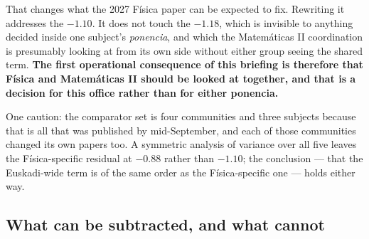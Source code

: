 \documentclass[
  10.5pt,
  a4paper,
  DIV=11,
  numbers=noendperiod]{scrartcl}
\begin{document}
That changes what the 2027 Física paper can be expected to fix.
Rewriting it addresses the \(-1.10\). It does not touch the \(-1.18\),
which is invisible to anything decided inside one subject's
\emph{ponencia}, and which the Matemáticas II coordination is presumably
looking at from its own side without either group seeing the shared
term. \textbf{The first operational consequence of this briefing is
therefore that Física and Matemáticas II should be looked at together,
and that is a decision for this office rather than for either ponencia.}

One caution: the comparator set is four communities and three subjects
because that is all that was published by mid-September, and each of
those communities changed its own papers too. A symmetric analysis of
variance over all five leaves the Física-specific residual at \(-0.88\)
rather than \(-1.10\); the conclusion --- that the Euskadi-wide term is
of the same order as the Física-specific one --- holds either way.

\subsection{What can be subtracted, and what
cannot}\label{what-can-be-subtracted-and-what-cannot}
\end{document}
